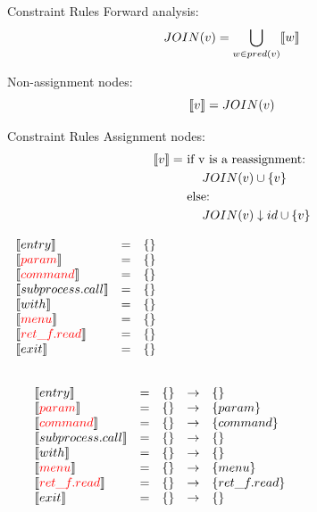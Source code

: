 \begin{frame}{Constraint Rules}{}
  {\color{red} Forward} analysis:
  \[ JOIN(v) = \bigcup_{ w \in pred(v)} \llbracket w \rrbracket \]

  Non-assignment nodes:
    \[ \llbracket v \rrbracket = JOIN(v) \]
\end{frame}

\begin{frame}{Constraint Rules}{}
    Assignment nodes:
  \begin{align*}
  \llbracket v \rrbracket = &\text{ if v is a reassignment:}\\
  &\phantom{==}JOIN(v) \cup \{ v \}\\
  &\text{ else:}\\
  &\phantom{==}JOIN(v) \downarrow id \cup \{ v \}\\
  \end{align*}
\end{frame}

\begin{frame}
\[
\begin{array}{lclcl}
  \constraint{entry} & = & \{\} &\phantom{hahahahhh}\\
  \assignconstraint{param} & = & \{\} &\\
  \assignconstraint{command} & = & \{\}&\\
  \constraint{subprocess.call} & = & \{\}&\\
  \constraint{with} & = & \{\}&\\
  \assignconstraint{menu} & = & \{\}&\\
  \assignconstraint{ret\_f.read} & = & \{\}&\\
  \constraint{exit} & = & \{\}&\\
  && \phantom{\{command, param\}} && \phantom{\{command, param\}}
\end{array}
\]
\end{frame}

\begin{frame}
\[
\begin{array}{lclcl}
  \constraint{entry} & = & \{\} & \rightarrow & \{\}\\
  \assignconstraint{param} & = & \{\} & \rightarrow &\{param\}\\
  \assignconstraint{command} & = & \{\}& \rightarrow &\{command\}\\
  \constraint{subprocess.call} & = & \{\}& \rightarrow &\{\}\\
  \constraint{with} & = & \{\}&\rightarrow & \{\}\\
  \assignconstraint{menu} & = & \{\}& \rightarrow & \{menu\}\\
  \assignconstraint{ret\_f.read} & = & \{\}&\rightarrow & \{ret\_f.read\}\\
  \constraint{exit} & = & \{\}&\rightarrow & \{\}\\
  && && \phantom{\{command, param\}\{command, param\}}
\end{array}
\]
\end{frame}

